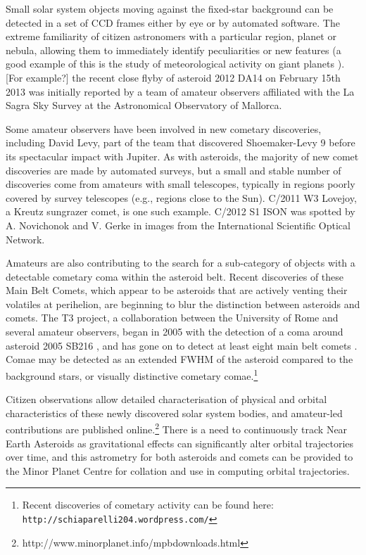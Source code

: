 \documentclass{ar2e}
\begin{document}
Small solar system objects moving against the fixed-star background can be
detected in a set of CCD frames either by eye or by automated software. The
extreme familiarity of citizen astronomers with a particular region, planet or
nebula, allowing them to immediately identify peculiarities or new features (a
good example of this is the study of meteorological activity on giant planets
\citep{95rogers}).   [For example?] the recent close flyby of asteroid 2012 DA14
on February 15th 2013 was initially reported by a team of amateur observers
affiliated with the La Sagra Sky Survey at the Astronomical Observatory of
Mallorca. 

Some amateur observers have been involved in new cometary discoveries, including
David Levy, part of the team that discovered Shoemaker-Levy 9 before its
spectacular impact with Jupiter.  
As with asteroids, the majority of new comet discoveries are
made by automated surveys, but a small and stable number of discoveries come
from amateurs with small telescopes, typically in regions poorly covered by
survey telescopes (e.g., regions close to the Sun).   C/2011 W3 Lovejoy, a
Kreutz sungrazer comet, is one such example.  C/2012 S1 ISON was spotted by A.
Novichonok and V. Gerke in images from the International Scientific Optical
Network. 

Amateurs are also contributing to the search for a sub-category of objects
with a detectable cometary coma within the asteroid belt.  Recent discoveries
of these Main Belt Comets, which appear to be asteroids that are actively
venting their volatiles at perihelion, are beginning to blur the distinction
between asteroids and comets.  The T3 project, a collaboration between the
University of Rome and several amateur observers, began in 2005 with the
detection of a coma around asteroid 2005 SB216 \citep{05buzzi}, and has gone
on to detect at least eight main belt comets \citep{13mousis}. Comae may be
detected as an extended FWHM of the asteroid compared to the background stars,
or visually distinctive cometary comae.\footnote{Recent discoveries of cometary
activity can be found here: \texttt{http://schiaparelli204.wordpress.com/}}

Citizen observations allow detailed characterisation of physical and orbital
characteristics of these newly discovered solar system bodies, and amateur-led
contributions are published
online.\footnote{http://www.minorplanet.info/mpbdownloads.html}  There is a need
to continuously track Near Earth Asteroids as gravitational effects can
significantly alter orbital trajectories over time, and this astrometry for both
asteroids and comets can be provided to the Minor Planet Centre for collation
and use in computing orbital trajectories.  
\end{document}
